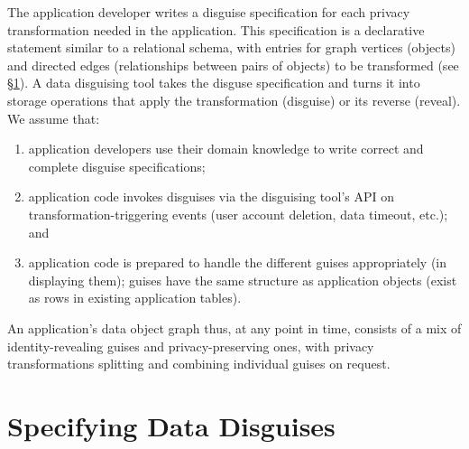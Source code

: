 %
The application developer writes a disguise specification for each privacy transformation needed
in the application.
%
This specification is a declarative statement similar to a relational schema, with entries for
graph vertices (objects) and directed edges (relationships between pairs of objects)
to be transformed (see \S\ref{sec:policies}).
%
A data disguising tool takes the disguse specification and turns it into storage
operations that apply the transformation (disguise) or its reverse (reveal).
%
%
We assume that:
\begin{enumerate}[nosep]
  \item application developers use their domain knowledge to write correct and complete
    disguise specifications;
  \item application code invokes disguises via the disguising tool's API on
    transformation-triggering events (\eg user account deletion, data timeout, etc.); and
  \item application code is prepared to handle the different guises appropriately (\eg in displaying
      them); guises have the same structure as application objects (\eg exist as rows in existing
        application tables).
\end{enumerate}
%
An application's data object graph thus, at any point in time, consists of a mix of
identity-revealing guises and privacy-preserving ones, with privacy transformations splitting
and combining individual guises on request.
%
%

\section{Specifying Data Disguises}
\label{sec:policies}

